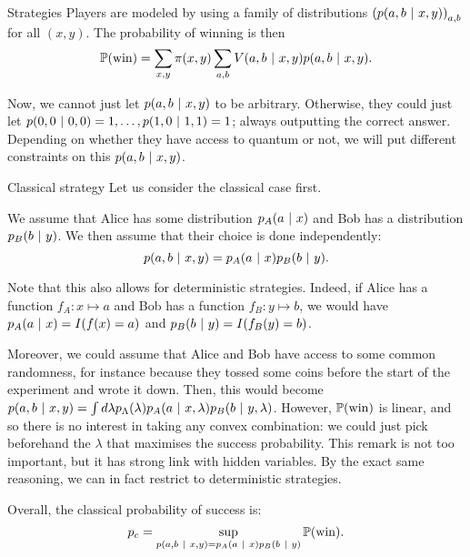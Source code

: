 \documentclass[a4paper]{article}
\begin{document}
\begin{parag}{Strategies}
    Players are modeled by using a family of distributions $\left(p\left(a, b \suchthat x, y\right)\right)_{a, b}$ for all $\left(x, y\right)$. The probability of winning is then 
    \[\prob\left(\text{win}\right) = \sum_{x,y} \pi\left(x, y\right) \sum_{a, b} V\left(a, b \suchthat x, y\right) p\left(a, b \suchthat x, y\right).\]

    Now, we cannot just let $p\left(a, b \suchthat x, y\right)$ to be arbitrary. Otherwise, they could just let $p\left(0, 0 \suchthat 0, 0\right) = 1, \ldots, p\left(1, 0 \suchthat 1, 1\right) = 1$; always outputting the correct answer. Depending on whether they have access to quantum or not, we will put different constraints on this $p\left(a, b \suchthat x, y\right)$.

    \begin{subparag}{Classical strategy}
        Let us consider the classical case first.

        We assume that Alice has some distribution $p_A\left(a \suchthat x\right)$ and Bob has a distribution $p_B\left(b \suchthat y\right)$. We then assume that their choice is done independently: 
        \[p\left(a, b \suchthat x, y\right) = p_A\left(a \suchthat x\right) p_B\left(b \suchthat y\right).\]
        
        Note that this also allows for deterministic strategies. Indeed, if Alice has a function $f_A: x \mapsto a$ and Bob has a function $f_B : y \mapsto b$, we would have $p_A\left(a \suchthat x\right) = I\left(f\left(x\right) = a\right)$ and $p_B\left(b \suchthat y\right) = I\left(f_B\left(y\right) = b\right)$.

        Moreover, we could assume that Alice and Bob have access to some common randomness, for instance because they tossed some coins before the start of the experiment and wrote it down. Then, this would become $p\left(a, b \suchthat x, y\right) = \int  d \lambda p_{\Lambda}\left(\lambda\right) p_A\left(a \suchthat x, \lambda\right) p_B\left(b \suchthat y, \lambda\right)$. However, $\prob\left(\text{win}\right)$ is linear, and so there is no interest in taking any convex combination: we could just pick beforehand the $\lambda$ that maximises the success probability. This remark is not too important, but it has strong link with hidden variables. By the exact same reasoning, we can in fact restrict to deterministic strategies.

        Overall, the classical probability of success is: 
        \[p_c = \sup_{p\left(a, b \suchthat x, y\right) = p_A\left(a \suchthat x\right) p_B\left(b \suchthat y\right)} \prob\left(\text{win}\right).\]
    \end{subparag}


\end{parag}
\end{document}
